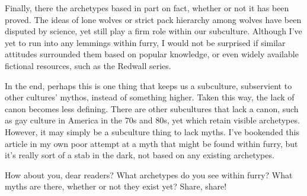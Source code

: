 Finally, there the archetypes based in part on fact, whether or not it has been proved. The ideas of lone wolves or strict pack hierarchy among wolves have been disputed by science, yet still play a firm role within our subculture. Although I've yet to run into any lemmings within furry, I would not be surprised if similar attitudes surrounded them based on popular knowledge, or even widely available fictional resources, such as the Redwall series.

In the end, perhaps this is one thing that keeps us a subculture, subservient to other cultures' mythos, instead of something higher. Taken this way, the lack of canon becomes less defining. There are other subcultures that lack a canon, such as gay culture in America in the 70s and 80s, yet which retain visible archetypes. However, it may simply be a subculture thing to lack myths. I've bookended this article in my own poor attempt at a myth that might be found within furry, but it's really sort of a stab in the dark, not based on any existing archetypes.

How about you, dear readers? What archetypes do you see within furry? What myths are there, whether or not they exist yet? Share, share!

